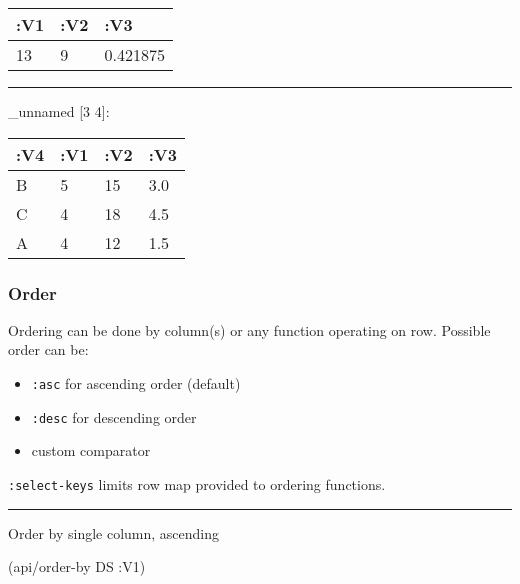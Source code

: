 \documentclass[]{article}
\newenvironment{Shaded}{\begin{snugshade}}{\end{snugshade}}
\newcommand{\AttributeTok}[1]{\textcolor[rgb]{0.77,0.63,0.00}{#1}}
\newcommand{\KeywordTok}[1]{\textcolor[rgb]{0.13,0.29,0.53}{\textbf{#1}}}
\newcommand{\NormalTok}[1]{#1}
\newcommand{\VariableTok}[1]{\textcolor[rgb]{0.00,0.00,0.00}{#1}}
\providecommand{\tightlist}{%
  \setlength{\itemsep}{0pt}\setlength{\parskip}{0pt}}
\begin{document}
\begin{longtable}[]{@{}lll@{}}
\toprule
:V1 & :V2 & :V3\tabularnewline
\midrule
\endhead
13 & 9 & 0.421875\tabularnewline
\bottomrule
\end{longtable}

\begin{center}\rule{0.5\linewidth}{0.5pt}\end{center}

\begin{Shaded}
\end{Shaded}

\_unnamed {[}3 4{]}:

\begin{longtable}[]{@{}llll@{}}
\toprule
:V4 & :V1 & :V2 & :V3\tabularnewline
\midrule
\endhead
B & 5 & 15 & 3.0\tabularnewline
C & 4 & 18 & 4.5\tabularnewline
A & 4 & 12 & 1.5\tabularnewline
\bottomrule
\end{longtable}

\hypertarget{order}{%
\subsubsection{Order}\label{order}}

Ordering can be done by column(s) or any function operating on row.
Possible order can be:

\begin{itemize}
\tightlist
\item
  \texttt{:asc} for ascending order (default)
\item
  \texttt{:desc} for descending order
\item
  custom comparator
\end{itemize}

\texttt{:select-keys} limits row map provided to ordering functions.

\begin{center}\rule{0.5\linewidth}{0.5pt}\end{center}

Order by single column, ascending

\begin{Shaded}
\begin{Highlighting}[]
\NormalTok{(api/order-by DS }\AttributeTok{:V1}\NormalTok{)}
\end{Highlighting}
\end{Shaded}
\end{document}
